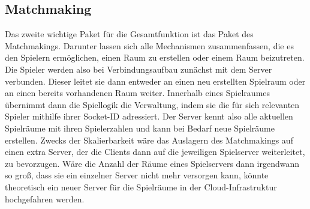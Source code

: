 \documentclass[conference]{IEEEtran}
\begin{document}
\subsection{Matchmaking}
Das zweite wichtige Paket für die Gesamtfunktion ist das Paket des Matchmakings. Darunter lassen sich alle Mechanismen zusammenfassen, die es den Spielern ermöglichen, einen Raum\cite{rooms} zu erstellen oder einem Raum beizutreten. Die Spieler werden also bei Verbindungsaufbau zunächst mit dem Server verbunden. Dieser leitet sie dann entweder an einen neu erstellten Spielraum oder an einen bereits vorhandenen Raum weiter. Innerhalb eines Spielraumes übernimmt dann die Spiellogik die Verwaltung, indem sie die für sich relevanten Spieler mithilfe ihrer Socket-ID adressiert. Der Server kennt also alle aktuellen Spielräume mit ihren Spielerzahlen und kann bei Bedarf neue Spielräume erstellen.\newline
Zwecks der Skalierbarkeit wäre das Auslagern des Matchmakings auf einen extra Server, der die Clients dann auf die jeweiligen Spielserver weiterleitet, zu bevorzugen.
Wäre die Anzahl der Räume eines Spielservers dann irgendwann so groß, dass sie ein einzelner Server nicht mehr versorgen kann, könnte theoretisch ein neuer Server für die Spielräume in der Cloud-Infrastruktur hochgefahren werden.
\end{document}
